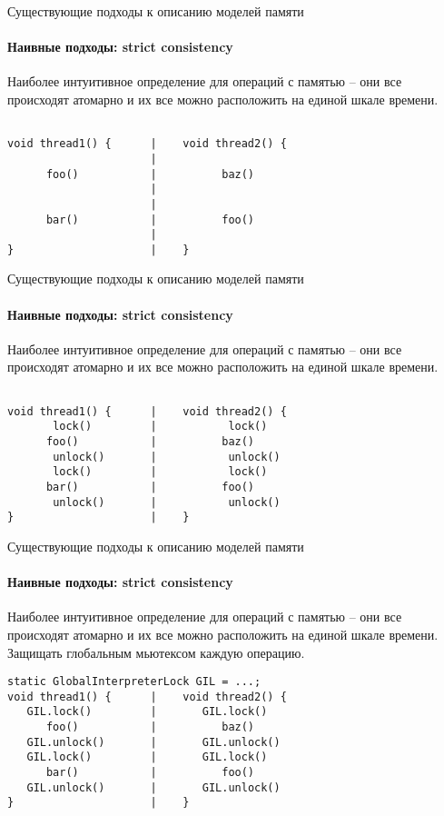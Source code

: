 \begin{frame}{Существующие подходы к описанию моделей памяти}
\framesubtitle{Наивные подходы: strict consistency}

Наиболее интуитивное определение для операций с памятью -- они все происходят атомарно и их все можно расположить на единой шкале времени.


\begin{lstlisting}

void thread1() {      |    void thread2() {                                   
                      |
      foo()           |          baz()                           
                      |
                      |
      bar()           |          foo()                           
                      |
}                     |    }                    
\end{lstlisting}
\end{frame}

\begin{frame}{Существующие подходы к описанию моделей памяти}
\framesubtitle{Наивные подходы: strict consistency}

Наиболее интуитивное определение для операций с памятью -- они все происходят атомарно и их все можно расположить на единой шкале времени.

\begin{lstlisting}

void thread1() {      |    void thread2() {                                   
       lock()         |           lock()
      foo()           |          baz()                           
       unlock()       |           unlock()
       lock()         |           lock()
      bar()           |          foo()                           
       unlock()       |           unlock()
}                     |    }                    
\end{lstlisting}	

\end{frame}

\begin{frame}{Существующие подходы к описанию моделей памяти}
\framesubtitle{Наивные подходы: strict consistency}

Наиболее интуитивное определение для операций с памятью -- они все происходят атомарно и их все можно расположить на единой шкале времени.
Защищать глобальным мьютексом каждую операцию.

\begin{lstlisting}
static GlobalInterpreterLock GIL = ...;
void thread1() {      |    void thread2() {                                   
   GIL.lock()         |       GIL.lock()
      foo()           |          baz()                           
   GIL.unlock()       |       GIL.unlock()
   GIL.lock()         |       GIL.lock()
      bar()           |          foo()                           
   GIL.unlock()       |       GIL.unlock()
}                     |    }                    
\end{lstlisting}	

\end{frame}

